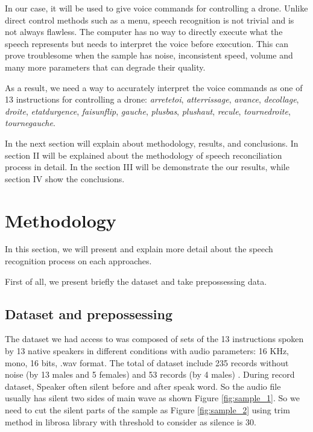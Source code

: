 \documentclass[%
  article,%
  10pt,%
  a4paper,%
  fleqn,%
  oneside,%
  sumario = tradicional,%
  chapter = TITLE,%
  section = TITLE,%
]{abntex2}
\begin{document}

In our case, it will be used to give voice commands for controlling a drone. Unlike direct control methods such as a menu, speech recognition is not trivial and is not always flawless. The computer has no way to directly execute what the speech represents but needs to interpret the voice before execution. This can prove troublesome when the sample has noise, inconsistent speed, volume and many more parameters that can degrade their quality.

As a result, we need a way to accurately interpret the voice commands as one of 13 instructions for controlling a drone: \textit{arretetoi}, \textit{atterrissage}, \textit{avance}, \textit{decollage}, \textit{droite}, \textit{etatdurgence}, \textit{faisunflip}, \textit{gauche}, \textit{plusbas}, \textit{plushaut}, \textit{recule}, \textit{tournedroite}, \textit{tournegauche}.

In the next section will explain about methodology, results, and conclusions. In section II will be explained about the methodology of speech reconciliation process in detail. In the section III will be demonstrate the our results, while section IV show the conclusions. 

\section{Methodology}\label{sec:met}
In this section, we will present and explain more detail about the speech recognition process on each approaches.

First of all, we present briefly the dataset and take prepossessing data.
\subsection{Dataset and prepossessing}
The dataset we had access to was composed of sets of the 13 instructions spoken by 13 native speakers in different conditions with audio parameters: 16 KHz, mono, 16 bits, .wav format. The total of dataset include 235 records without noise (by 13 males and 5 females) and 53 records (by 4 males) .
During record dataset, Speaker often silent before and after speak word. So the audio file usually has silent two sides of main wave as shown Figure \ref{fig:sample_1}. So we need to cut the silent parts of the sample as Figure \ref{fig:sample_2} using trim method in librosa library with threshold to consider as silence is 30.
\end{document}
